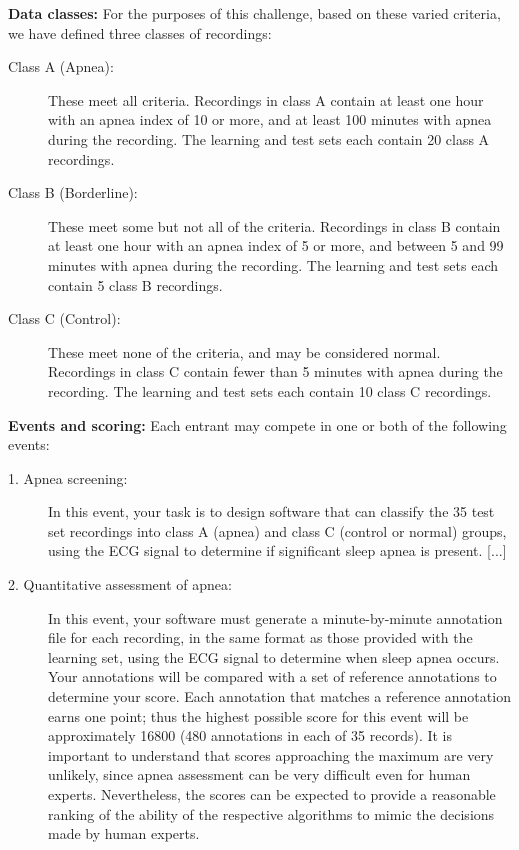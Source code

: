 {  {\rm \textbf{Data classes:}}
  For the purposes of this challenge, based on these varied criteria,
  we have defined three classes of recordings:
  \begin{description}
  \item[Class A (Apnea):] These meet all criteria. Recordings in class
    A contain at least one hour with an apnea index of 10 or more, and
    at least 100 minutes with apnea during the recording. The learning
    and test sets each contain 20 class A recordings.
  \item[Class B (Borderline):] These meet some but not all of the
    criteria. Recordings in class B contain at least one hour with an
    apnea index of 5 or more, and between 5 and 99 minutes with apnea
    during the recording. The learning and test sets each contain 5
    class B recordings.
  \item[Class C (Control):] These meet none of the criteria, and may
    be considered normal. Recordings in class C contain fewer than 5
    minutes with apnea during the recording. The learning and test
    sets each contain 10 class C recordings.
  \end{description}

  {\rm \textbf{Events and scoring:}}
  Each entrant may compete in one or both of the following events:
  \begin{description}
  \item[1. Apnea screening:] In this event, your task is to design
    software that can classify the 35 test set recordings into class A
    (apnea) and class C (control or normal) groups, using the ECG
    signal to determine if significant sleep apnea is present.  [...]
  \item[2. Quantitative assessment of apnea:] In this event, your
    software must generate a minute-by-minute annotation file for each
    recording, in the same format as those provided with the learning
    set, using the ECG signal to determine when sleep apnea occurs.
    Your annotations will be compared with a set of reference
    annotations to determine your score. Each annotation that matches
    a reference annotation earns one point; thus the highest possible
    score for this event will be approximately 16800 (480 annotations
    in each of 35 records). It is important to understand that scores
    approaching the maximum are very unlikely, since apnea assessment
    can be very difficult even for human experts. Nevertheless, the
    scores can be expected to provide a reasonable ranking of the
    ability of the respective algorithms to mimic the decisions made
    by human experts.
  \end{description}
}%


